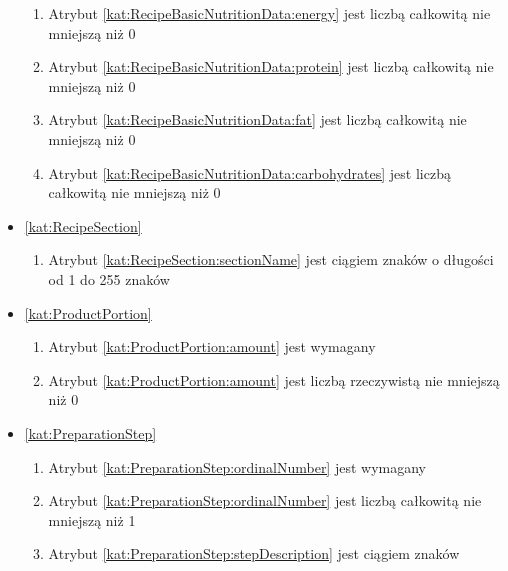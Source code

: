 \begin{itemize}[label={\textbf{Ograniczenia dla}}, wide, labelwidth=!, labelindent=0pt]
\begin{enumerate}[label={\textbf{OGR/\protect\threedigits{\arabic{enumi}}}}, wide, labelwidth=!, align=left, leftmargin=3cm, resume]
        \item Atrybut \ref{kat:RecipeBasicNutritionData:energy} jest liczbą całkowitą nie mniejszą niż 0
        \item Atrybut \ref{kat:RecipeBasicNutritionData:protein} jest liczbą całkowitą nie mniejszą niż 0
        \item Atrybut \ref{kat:RecipeBasicNutritionData:fat} jest liczbą całkowitą nie mniejszą niż 0
        \item Atrybut \ref{kat:RecipeBasicNutritionData:carbohydrates} jest liczbą całkowitą nie mniejszą niż 0
    \end{enumerate}

    \item\ref{kat:RecipeSection}
    \begin{enumerate}[label={\textbf{OGR/\protect\threedigits{\arabic{enumi}}}}, wide, labelwidth=!, align=left, leftmargin=3cm, resume]
        \item Atrybut \ref{kat:RecipeSection:sectionName} jest ciągiem znaków o długości od 1 do 255 znaków
    \end{enumerate}

    \item\ref{kat:ProductPortion}
    \begin{enumerate}[label={\textbf{OGR/\protect\threedigits{\arabic{enumi}}}}, wide, labelwidth=!, align=left, leftmargin=3cm, resume]
        \item Atrybut \ref{kat:ProductPortion:amount} jest wymagany

        \item Atrybut \ref{kat:ProductPortion:amount} jest liczbą rzeczywistą nie mniejszą niż 0
    \end{enumerate}

    \item\ref{kat:PreparationStep}
    \begin{enumerate}[label={\textbf{OGR/\protect\threedigits{\arabic{enumi}}}}, wide, labelwidth=!, align=left, leftmargin=3cm, resume]
        \item Atrybut \ref{kat:PreparationStep:ordinalNumber} jest wymagany

        \item Atrybut \ref{kat:PreparationStep:ordinalNumber} jest liczbą całkowitą nie mniejszą niż 1
        \item Atrybut \ref{kat:PreparationStep:stepDescription} jest ciągiem znaków
    \end{enumerate}


\end{itemize}
